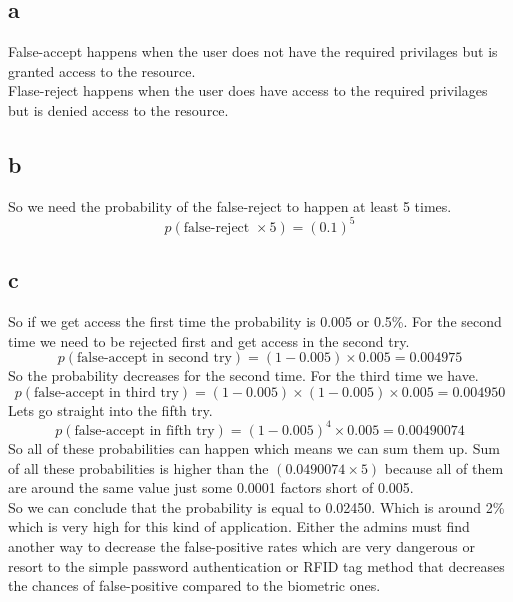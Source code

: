 \documentclass[a4paper, 11pt]{article}
\begin{document}
\subsection{a}
False-accept happens when the user does not have the required privilages but
is granted access to the resource. \\
Flase-reject happens when the user does have access to the required privilages
but is denied access to the resource.
\subsection{b}
So we need the probability of the false-reject to happen at least 5 times.
\begin{equation}
    p(\text{false-reject } \times 5) = (0.1) ^ 5
\end{equation}
\subsection{c}
So if we get access the first time the probability is 0.005 or 0.5\%.
For the second time we need to be rejected first and get access in the second
try.
\begin{equation}
    p(\text{false-accept in second try}) = (1 - 0.005) \times 0.005 = 0.004975
\end{equation}
So the probability decreases for the second time. For the third time we have.
\begin{equation}
    p(\text{false-accept in third try}) = (1 - 0.005) \times (1 - 0.005)
    \times 0.005 = 0.004950
\end{equation}
Lets go straight into the fifth try.
\begin{equation}
    p(\text{false-accept in fifth try}) = (1 - 0.005)^4 \times 0.005 = 0.00490074
\end{equation}
So all of these probabilities can happen which means we can sum them up.
Sum of all these probabilities is higher than the $(0.0490074 \times 5)$ because
all of them are around the same value just some 0.0001 factors short of 0.005.
\\
So we can conclude that the probability is equal to 0.02450.
Which is around 2\% which is very high for this kind of application.
Either the admins must find another way to decrease the false-positive rates
which are very dangerous or resort to the simple password authentication or
RFID tag method that decreases the chances of false-positive compared to the
biometric ones.
\end{document}
